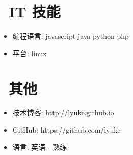 \documentclass{resume}
\begin{document}

\section{\faCogs\ IT 技能}
\begin{itemize}[parsep=0.5ex]
  \item 编程语言: javascript java python php
  \item 平台: linux
\end{itemize}


\section{\faInfo\ 其他}
\begin{itemize}[parsep=0.5ex]
  \item 技术博客: http://lyuke.github.io
  \item GitHub: https://github.com/lyuke
  \item 语言: 英语 - 熟练
\end{itemize}

%
%
\end{document}
